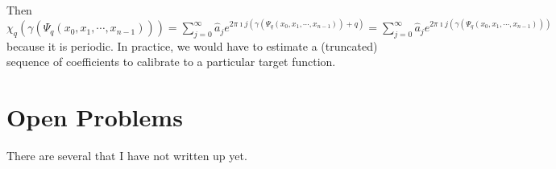 Then $\chi_q\left(\gamma\left(\Psi_q\left(x_0, x_1, \cdots, x_{n - 1}\right)\right)\right) = \sum\limits_{j = 0}^\infty \widehat{a}_j e^{2\pi \imath j \left(\gamma\left(\Psi_q\left(x_0, x_1, \cdots, x_{n - 1}\right)\right) + q\right)} = \sum\limits_{j = 0}^\infty \widehat{a}_j e^{2\pi \imath j \left(\gamma\left(\Psi_q\left(x_0, x_1, \cdots, x_{n - 1}\right)\right)\right)}$ because it is periodic. In practice, we would have to estimate a (truncated) sequence of coefficients to calibrate to a particular target function.

\chapter{Open Problems}\label{ch:OpenProblems}

There are several that I have not written up yet.

\nocite{*}  %

